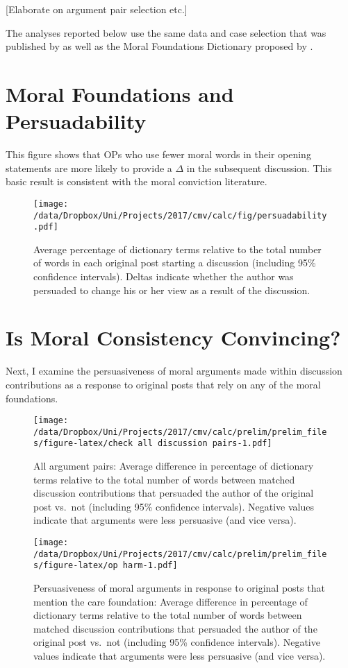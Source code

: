 {[}Elaborate on argument pair selection etc.{]}

The analyses reported below use the same data and case selection that was published by \citet{tan2016winning} as well as the Moral Foundations Dictionary proposed by \citet{graham2009liberals}.

\section{Moral Foundations and Persuadability}\label{moral-foundations-and-persuadability}

This figure shows that OPs who use fewer moral words in their opening statements are more likely to provide a \(\Delta\) in the subsequent discussion. This basic result is consistent with the moral conviction literature.

\begin{figure}
\centering
\texttt{[image: /data/Dropbox/Uni/Projects/2017/cmv/calc/fig/persuadability.pdf]}
\caption{Average percentage of dictionary terms relative to the total number of words in each original post starting a discussion (including 95\% confidence intervals). Deltas indicate whether the author was persuaded to change his or her view as a result of the discussion.}
\end{figure}

\section{Is Moral Consistency
Convincing?}\label{is-moral-consistency-convincing}

Next, I examine the persuasiveness of moral arguments made within discussion contributions as a response to original posts that rely on any of the moral foundations.

\begin{figure}
\centering
\texttt{[image: /data/Dropbox/Uni/Projects/2017/cmv/calc/prelim/prelim\_files/figure-latex/check all discussion pairs-1.pdf]}
\caption{All argument pairs: Average difference in percentage of
dictionary terms relative to the total number of words between matched
discussion contributions that persuaded the author of the original post
vs.~not (including 95\% confidence intervals). Negative values indicate
that arguments were less persuasive (and vice versa).}
\end{figure}

\begin{figure}
\centering
\texttt{[image: /data/Dropbox/Uni/Projects/2017/cmv/calc/prelim/prelim\_files/figure-latex/op harm-1.pdf]}
\caption{Persuasiveness of moral arguments in response to original posts
that mention the care foundation: Average difference in percentage of
dictionary terms relative to the total number of words between matched
discussion contributions that persuaded the author of the original post
vs.~not (including 95\% confidence intervals). Negative values indicate
that arguments were less persuasive (and vice versa).}
\end{figure}

